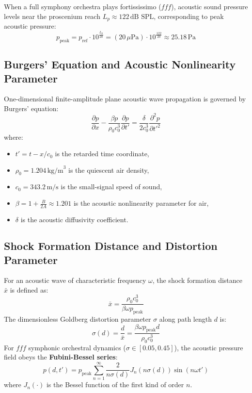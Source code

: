 \documentclass[11pt,a4paper]{article}
\begin{document}
When a full symphony orchestra plays fortississimo ($fff$), acoustic sound pressure levels near the proscenium reach $L_p \approx 122\,\text{dB SPL}$, corresponding to peak acoustic pressure:
\begin{equation}
p_{\text{peak}} = p_{\text{ref}} \cdot 10^{\frac{L_p}{20}} = (20\,\mu\text{Pa}) \cdot 10^{\frac{122}{20}} \approx 25.18\,\text{Pa}
\end{equation}

\subsection{Burgers' Equation and Acoustic Nonlinearity Parameter}
One-dimensional finite-amplitude plane acoustic wave propagation is governed by Burgers' equation:
\begin{equation}
\frac{\partial p}{\partial x} - \frac{\beta p}{\rho_0 c_0^3} \frac{\partial p}{\partial t'} = \frac{\delta}{2 c_0^3} \frac{\partial^2 p}{\partial {t'}^2}
\end{equation}
where:
\begin{itemize}
    \item $t' = t - x/c_0$ is the retarded time coordinate,
    \item $\rho_0 = 1.204\,\text{kg/m}^3$ is the quiescent air density,
    \item $c_0 = 343.2\,\text{m/s}$ is the small-signal speed of sound,
    \item $\beta = 1 + \frac{B}{2A} \approx 1.201$ is the acoustic nonlinearity parameter for air,
    \item $\delta$ is the acoustic diffusivity coefficient.
\end{itemize}

\subsection{Shock Formation Distance and Distortion Parameter}
For an acoustic wave of characteristic frequency $\omega$, the shock formation distance $\bar{x}$ is defined as:
\begin{equation}
\bar{x} = \frac{\rho_0 c_0^3}{\beta \omega p_{\text{peak}}}
\end{equation}
The dimensionless Goldberg distortion parameter $\sigma$ along path length $d$ is:
\begin{equation}
\sigma(d) = \frac{d}{\bar{x}} = \frac{\beta \omega p_{\text{peak}} d}{\rho_0 c_0^3}
\end{equation}
For $fff$ symphonic orchestral dynamics ($\sigma \in [0.05, 0.45]$), the acoustic pressure field obeys the \textbf{Fubini-Bessel series}:
\begin{equation}
p(d, t') = p_{\text{peak}} \sum_{n=1}^{\infty} \frac{2}{n \sigma(d)} J_n(n \sigma(d)) \sin(n \omega t')
\end{equation}
where $J_n(\cdot)$ is the Bessel function of the first kind of order $n$.
\end{document}
